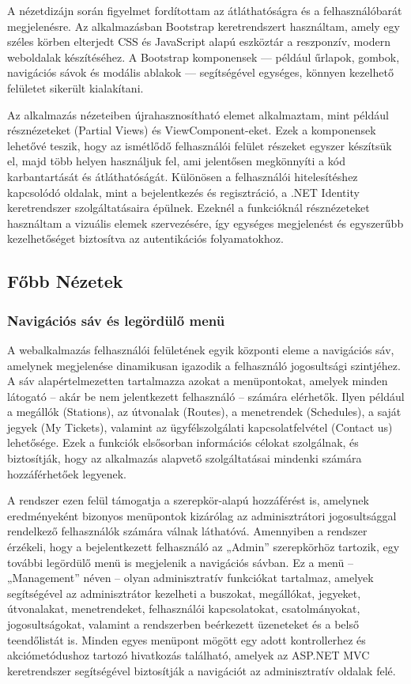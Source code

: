 A nézetdizájn során figyelmet fordítottam az átláthatóságra és a felhasználóbarát megjelenésre. Az alkalmazásban Bootstrap keretrendszert használtam, amely egy széles körben elterjedt CSS és JavaScript alapú eszköztár a reszponzív, modern weboldalak készítéséhez. A Bootstrap komponensek — például űrlapok, gombok, navigációs sávok és modális ablakok — segítségével egységes, könnyen kezelhető felületet sikerült kialakítani.

Az alkalmazás nézeteiben újrahasznosítható elemet alkalmaztam, mint például résznézeteket (Partial Views) és ViewComponent-eket. Ezek a komponensek lehetővé teszik, hogy az ismétlődő felhasználói felület részeket egyszer készítsük el, majd több helyen használjuk fel, ami jelentősen megkönnyíti a kód karbantartását és átláthatóságát. Különösen a felhasználói hitelesítéshez kapcsolódó oldalak, mint a bejelentkezés és regisztráció, a .NET Identity keretrendszer szolgáltatásaira épülnek. Ezeknél a funkcióknál résznézeteket használtam a vizuális elemek szervezésére, így egységes megjelenést és egyszerűbb kezelhetőséget biztosítva az autentikációs folyamatokhoz.

\subsection{Főbb Nézetek}
\subsubsection{Navigációs sáv és legördülő menü }
A webalkalmazás felhasználói felületének egyik központi eleme a navigációs sáv, amelynek megjelenése dinamikusan igazodik a felhasználó jogosultsági szintjéhez. A sáv alapértelmezetten tartalmazza azokat a menüpontokat, amelyek minden látogató – akár be nem jelentkezett felhasználó – számára elérhetők. Ilyen például a megállók (Stations), az útvonalak (Routes), a menetrendek (Schedules), a saját jegyek (My Tickets), valamint az ügyfélszolgálati kapcsolatfelvétel (Contact us) lehetősége. Ezek a funkciók elsősorban információs célokat szolgálnak, és biztosítják, hogy az alkalmazás alapvető szolgáltatásai mindenki számára hozzáférhetőek legyenek.

A rendszer ezen felül támogatja a szerepkör-alapú hozzáférést is, amelynek eredményeként bizonyos menüpontok kizárólag az adminisztrátori jogosultsággal rendelkező felhasználók számára válnak láthatóvá. Amennyiben a rendszer érzékeli, hogy a bejelentkezett felhasználó az „Admin” szerepkörhöz tartozik, egy további legördülő menü is megjelenik a navigációs sávban. Ez a menü – „Management” néven – olyan adminisztratív funkciókat tartalmaz, amelyek segítségével az adminisztrátor kezelheti a buszokat, megállókat, jegyeket, útvonalakat, menetrendeket, felhasználói kapcsolatokat, csatolmányokat, jogosultságokat, valamint a rendszerben beérkezett üzeneteket és a belső teendőlistát is. Minden egyes menüpont mögött egy adott kontrollerhez és akciómetódushoz tartozó hivatkozás található, amelyek az ASP.NET MVC keretrendszer segítségével biztosítják a navigációt az adminisztratív oldalak felé.

